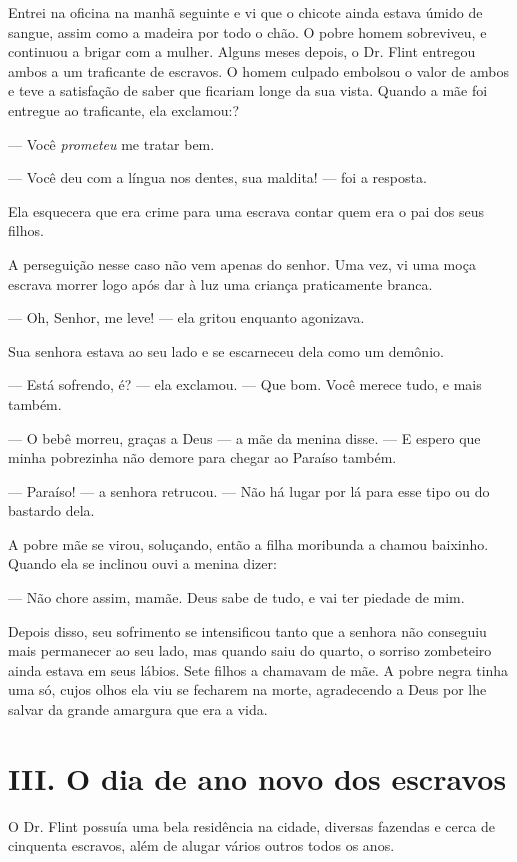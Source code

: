 Entrei na oficina na manhã seguinte e
vi que o chicote ainda estava úmido de sangue, assim como a madeira por
todo o chão. O pobre homem sobreviveu, e continuou a brigar com a
mulher. Alguns meses depois, o Dr. Flint entregou ambos a um traficante
de escravos. O homem culpado embolsou o valor de ambos e teve a
satisfação de saber que ficariam longe da sua vista. Quando a mãe foi
entregue ao traficante, ela exclamou:?

--- Você \emph{prometeu} me tratar bem.

--- Você deu com a língua nos dentes, sua maldita! --- foi a resposta.

Ela esquecera que era crime para uma escrava contar quem era o pai dos
seus filhos.

A perseguição nesse caso não vem apenas
do senhor. Uma vez, vi uma moça escrava morrer logo após dar à luz uma
criança praticamente branca.

--- Oh, Senhor, me leve! --- ela gritou enquanto agonizava.

Sua senhora estava ao seu lado e se escarneceu dela como um demônio.

--- Está sofrendo, é? --- ela exclamou. --- Que bom. Você merece tudo, e
mais também.

--- O bebê morreu, graças a Deus --- a
mãe da menina disse. --- E espero que minha pobrezinha não demore para
chegar ao Paraíso também.

--- Paraíso! --- a senhora retrucou.
--- Não há lugar por lá para esse tipo ou do bastardo dela.

A pobre mãe se virou, soluçando, então
a filha moribunda a chamou baixinho. Quando ela se inclinou ouvi a
menina dizer:

--- Não chore assim, mamãe. Deus sabe de tudo, e  vai ter piedade de
mim.

Depois disso, seu sofrimento se
intensificou tanto que a senhora não conseguiu mais permanecer ao seu
lado, mas quando saiu do quarto, o sorriso zombeteiro ainda estava em
seus lábios. Sete filhos a chamavam de mãe. A pobre negra tinha uma só,
cujos olhos ela viu se fecharem na morte, agradecendo a Deus por lhe
salvar da grande amargura que era a vida.

\chapter{III. O dia de ano novo dos
escravos}


O Dr. Flint possuía uma bela residência
na cidade, diversas fazendas e cerca de cinquenta escravos, além de
alugar vários outros todos os anos.

